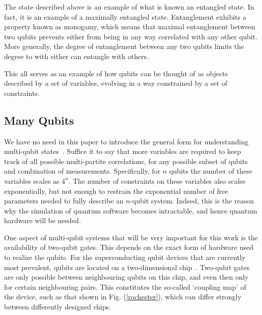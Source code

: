 \documentclass[conference]{IEEEtran}
\begin{document}
The state described above is an example of what is known an entangled state. In fact, it is an example of a maximally entangled state. Entanglement exhibits a property known as monogamy, which means that maximal entanglement between two qubits prevents either from being in any way correlated with any other qubit. More generally, the degree of entanglement between any two qubits limits the degree to with either can entangle with others.

This all serves as an example of how qubits can be thought of as objects described by a set of variables, evolving in a way constrained by a set of constraints.


\subsection{Many Qubits}

We have no need in this paper to introduce the general form for understanding multi-qubit states~\cite{qiskit-textbook}. Suffice it to say that more variables are required to keep track of all possible multi-partite correlations, for any possible subset of qubits and combination of measurements. Specifically, for $n$ qubits the number of these variables scales as $4^n$. The number of constraints on these variables also scales exponentially, but not enough to restrain the exponential number of free parameters needed to fully describe an $n$-qubit system. Indeed, this is the reason why the simulation of quantum software becomes intractable, and hence quantum hardware will be needed.

One aspect of multi-qubit systems that will be very important for this work is the availability of two-qubit gates. This depends on the exact form of hardware used to realize the qubits. For the superconducting qubit devices that are currently most prevalent, qubits are located on a two-dimensional chip~\cite{murali:19}. Two-qubit gates are only possible between neighbouring qubits on this chip, and even then only for certain neighbouring pairs. This constitutes the so-called `coupling map' of the device, such as that shown in Fig. (\ref{rochester}), which can differ strongly between differently designed chips.
\end{document}
